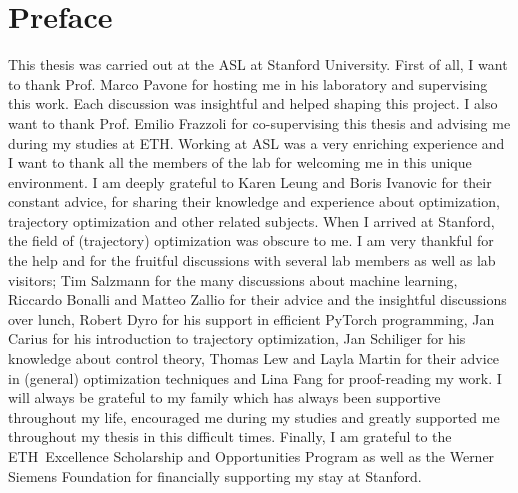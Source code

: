 \chapter*{Preface}
This thesis was carried out at the \ac{ASL} at Stanford University. First of all, I want to thank Prof. Marco Pavone for hosting me in his laboratory and supervising this work. Each discussion was insightful and helped shaping this project. I also want to thank Prof. Emilio Frazzoli for co-supervising this thesis and advising me during my studies at \ac{ETH}.
\newline
Working at \ac{ASL} was a very enriching experience and I want to thank all the members of the lab for welcoming me in this unique environment. I am deeply grateful to Karen Leung and Boris Ivanovic for their constant advice, for sharing their knowledge and experience about optimization, trajectory optimization and other related subjects.
\newline
When I arrived at Stanford, the field of (trajectory) optimization was obscure to me. I am very thankful for the help and for the fruitful discussions with several lab members as well as lab visitors; Tim Salzmann for the many discussions about machine learning, Riccardo Bonalli and Matteo Zallio for their advice and the insightful discussions over lunch, Robert Dyro for his support in efficient PyTorch programming, Jan Carius for his introduction to trajectory optimization, Jan Schiliger for his knowledge about control theory,  Thomas Lew and Layla Martin for their advice in (general) optimization techniques and Lina Fang for proof-reading my work. I will always be grateful to my family which has always been supportive throughout my life, encouraged me during my studies and greatly supported me throughout my thesis in this difficult times. Finally, I am grateful to the \ac{ETH} Excellence Scholarship and Opportunities Program as well as the Werner Siemens Foundation for financially supporting my stay at Stanford.

\cleardoublepage